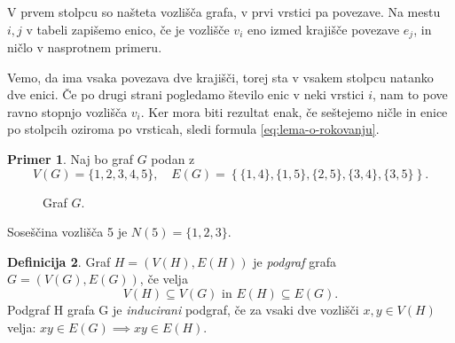 \documentclass[12pt,a4paper]{amsart}
\theoremstyle{definition} %
\newtheorem{definicija}{Definicija}[section]
\newtheorem{primer}[definicija]{Primer}
\theoremstyle{plain} %
\newcommand{\graf}[1][G]{\ensuremath{#1 = (V(#1), E(#1))}}
\newcommand{\vozlisca}[1][G]{\ensuremath{V(#1)}}
\newcommand{\povezave}[1][G]{\ensuremath{E(#1)}}
\begin{document}
    V prvem stolpcu so našteta vozlišča grafa, v prvi vrstici pa povezave. Na mestu $i,j$ v tabeli zapišemo enico, če je vozlišče $v_i$ eno izmed krajišče povezave $e_j$, in ničlo v nasprotnem primeru. 
    
    Vemo, da ima vsaka povezava dve krajišči, torej sta v vsakem stolpcu natanko dve enici. Če po drugi strani pogledamo število enic v neki vrstici $i$, nam to pove ravno stopnjo vozlišča $v_i$. Ker mora biti rezultat enak, če seštejemo ničle in enice po stolpcih oziroma po vrsticah, sledi formula \eqref{eq:lema-o-rokovanju}.
\endproof

\begin{primer}
    \label{primer:sosedi}
    Naj bo graf $G$ podan z \[\vozlisca = \{ 1,2,3,4,5 \}, \quad \povezave = \left\{ \{1,4\},\{1,5\},\{2,5\},\{3,4\},\{3,5\} \right\}.\]
    \begin{figure}[h]
        \caption{Graf $G$.}
    \end{figure}
    Soseščina vozlišča 5 je $N(5) = \{1,2,3\}$.
\end{primer}

\begin{definicija}
	Graf $\graf[H]$ je \emph{podgraf} grafa $\graf$, če velja 
	\[ \vozlisca[H] \subseteq \vozlisca \text{ in } \povezave[H] \subseteq \povezave. \]
	Podgraf H grafa G je \emph{inducirani} podgraf, če za vsaki dve vozlišči $x,y\in \vozlisca[H]$ velja: $xy \in \povezave \implies xy \in \povezave[H]$.
\end{definicija}
\end{document}
